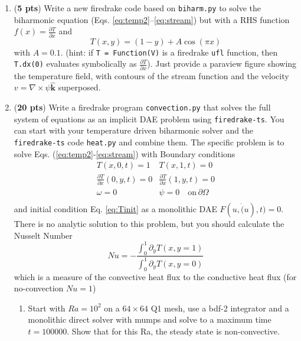 \documentclass[11pt]{article}
\begin{document}
\begin{enumerate}
\begin{enumerate}
    \item Repeat the exercise for the firedrake code using the same set of options.
    \item pick one solver set and compare the output log files for the two codes and determine where the principle differences in run time are coming from. 
  \end{enumerate}
  \item (\textbf{5 pts}) Write a new firedrake code based on \texttt{biharm.py} to solve the biharmonic equation (Eqs. \eqref{eq:temp2}--\eqref{eq:stream}) but with a RHS function $f(x) = \frac{\partial T}{\partial x}$ and \
  \begin{equation}
    T(x,y) = (1 - y) + A\cos(\pi x) \label{eq:Tinit}
  \end{equation}
  with $A=0.1$. (hint: if \texttt{T = Function(V)} is a firedrake \texttt{ufl} function, then \texttt{T.dx(0)} evaluates symbolically as $\frac{\partial T}{\partial x}$). Just provide a paraview figure showing the temperature field, with contours of the stream function and the velocity $v=\mathbb{\nabla}\times\psi\hat{\mathbf{k}}$ superposed.
  \item (\textbf{20 pts}) Write a firedrake program \texttt{convection.py} that solves the full system of equations as an implicit DAE problem using \texttt{firedrake-ts}.  You can start with your temperature driven biharmonic solver and the \texttt{firedrake-ts} code \texttt{heat.py} and combine them.  The specific problem is to solve Eqs. (\ref{eq:temp2}-\ref{eq:stream}) with Boundary conditions
  \begin{eqnarray*}
    T(x,0,t) = 1 & T(x,1,t) = 0\\
    \frac{\partial T}{\partial x}(0,y,t) = 0 & \frac{\partial T}{\partial x}(1,y,t)  = 0\\
    \omega = 0 & \psi = 0\quad\mathrm{on}\, \partial\Omega \\
  \end{eqnarray*}
  and initial condition Eq. \eqref{eq:Tinit} as a monolithic DAE $F(u,\dot(u),t)=0$.  There is no analytic solution to this problem, but you should calculate the Nusselt Number 
  \begin{displaymath}
    Nu = -\frac{\int_0^1 \partial_y T(x, y=1)}{\int_0^1 \partial_y T(x, y=0)}
  \end{displaymath}
  which is a measure of the convective heat flux to the conductive heat flux (for no-convection $Nu=1$)
  \begin{enumerate}
    \item Start with $Ra=10^2$ on a $64\times64$ Q1 mesh, use a bdf-2 integrator and a monolithic direct solver with mumps and solve to a maximum time $t=100000$.  Show that for this Ra, the steady state is non-convective.

\end{enumerate}
\end{enumerate}
\end{document}
